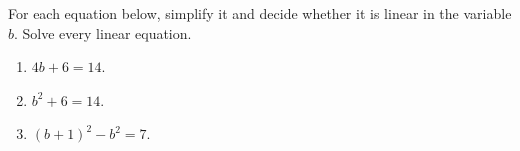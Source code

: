 For each equation below, simplify it and decide whether it is linear in the variable $b$. Solve every linear equation.
\begin{enumerate}
\item $4b+6=14$.
\item $b^2+6=14$.
\item $(b+1)^2-b^2=7$.
\end{enumerate}
